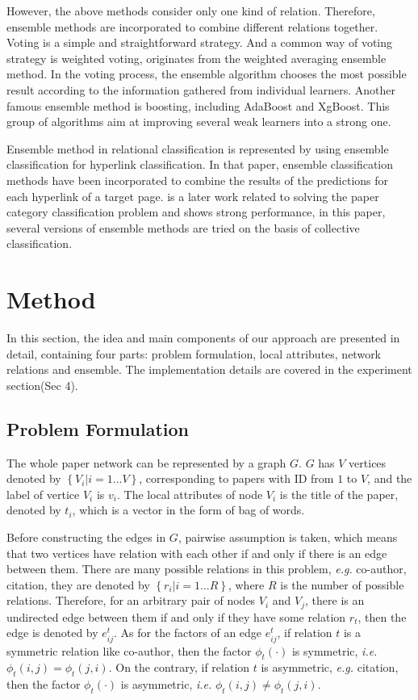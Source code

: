 \documentclass{sig-alternate}
\begin{document}
However, the above methods consider only one kind of relation. Therefore, ensemble methods are incorporated to combine different relations together. Voting is a simple and straightforward strategy. And a common way of voting strategy is weighted voting, originates from the weighted averaging ensemble method\cite{Markowitz1952PORTFOLIO}\cite{Perrone2015When}. In the voting process, the ensemble algorithm chooses the most possible result according to the information gathered from individual learners. Another famous ensemble method is boosting, including AdaBoost\cite{freund1997decision} and XgBoost\cite{Chen2016XGBoost}. This group of algorithms aim at improving several weak learners into a strong one.

Ensemble method in relational classification is represented by \cite{F2001Hyperlink} using ensemble classification for hyperlink classification. In that paper, ensemble classification methods have been incorporated to combine the results of the predictions for each hyperlink of a target page. \cite{preisach2006relational} is a later work related to solving the paper category classification problem and shows strong performance, in this paper, several versions of ensemble methods are tried on the basis of collective classification.

\section{Method}
In this section, the idea and main components of our approach are presented in detail, containing four parts: problem formulation, local attributes, network relations and ensemble. The implementation details are covered in the experiment section(Sec 4).

\subsection{Problem Formulation}
The whole paper network can be represented by a graph $G$. $G$ has $V$ vertices denoted by $\left \{ V_{i}|i=1...V \right \}$, corresponding to papers with ID from $1$ to $V$, and the label of vertice $V_{i}$ is $v_{i}$. The local attributes of node $V_{i}$ is the title of the paper, denoted by $t_{i}$, which is a vector in the form of bag of words. 

Before constructing the edges in $G$, pairwise assumption is taken, which means that two vertices have relation with each other if and only if there is an edge between them. There are many possible relations in this problem, \emph{e.g.} co-author, citation, they are denoted by $\left \{ r_{i}|i=1...R \right \}$, where $R$ is the number of possible relations. Therefore, for an arbitrary pair of nodes $V_{i}$ and $V_{j}$, there is an undirected edge between them if and only if they have some relation $r_t$, then the edge is denoted by $e^{t}_{ij}$. As for the factors of an edge $e^{t}_{ij}$, if relation $t$ is a symmetric relation like co-author, then the factor $\phi_{t}(\cdot)$ is symmetric, \emph{i.e.} $\phi_{t}(i,j)=\phi_{t}(j,i)$. On the contrary, if relation $t$ is asymmetric, \emph{e.g.} citation, then the factor $\phi_{t}(\cdot)$ is asymmetric, \emph{i.e.} $\phi_{t}(i,j)\neq\phi_{t}(j,i)$.
\end{document}
